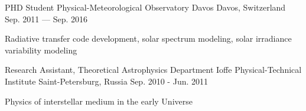 \begin{cventries}
  \cventry
    {PHD Student} %
    {Physical-Meteorological Observatory Davos} %
    {Davos, Switzerland} %
    {Sep. 2011 --- Sep. 2016} %
    {
      \begin{cvitems} %
        \item {Radiative transfer code development, solar spectrum modeling, solar irradiance variability modeling}
      \end{cvitems}
    }

  \cventry
    {Research Assistant, Theoretical Astrophysics Department} %
    {Ioffe Physical-Technical Institute} %
    {Saint-Petersburg, Russia} %
    {Sep. 2010 - Jun. 2011} %
    {
      \begin{cvitems} %
        \item {Physics of interstellar medium in the early Universe}
      \end{cvitems}
    }

\end{cventries}
